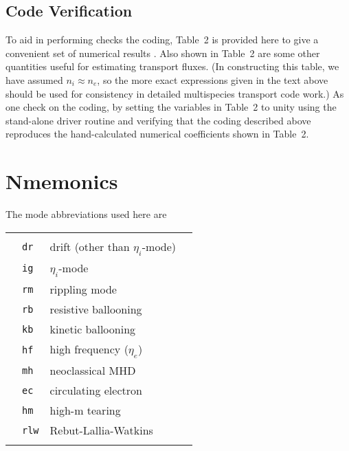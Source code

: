 
\subsection{Code Verification}

To aid in performing checks the coding, Table~2
is provided here to give a convenient set of numerical results
\cite{Comments}.
Also shown in Table~2 are some other quantities useful
for estimating transport fluxes.  (In constructing this table, we have
assumed $n_{i}\approx n_{e}$, so the more exact expressions given in the
text above
should be used for consistency in detailed multispecies transport code work.)
As one check on the coding, by setting the variables in Table~2 to
unity using the stand-alone driver routine and verifying that the coding
described above reproduces the hand-calculated numerical coefficients
shown in Table~2.

\section{Nmemonics}

The mode abbreviations used here are
\begin{center}
\begin{tabular}{llll}
    &             &                                         &        \\
    & {\tt dr}    & drift (other than $\eta_{i}$-mode)      &        \\
    & {\tt ig}    & $\eta_i$-mode                           &        \\
    & {\tt rm}    & rippling mode                           &        \\
    & {\tt rb}    & resistive ballooning                    &        \\
    & {\tt kb}    & kinetic ballooning                      &        \\
    & {\tt hf}    & high frequency ($\eta_{e}$)             &        \\
    & {\tt mh}    & neoclassical MHD                        &        \\
    & {\tt ec}    & circulating electron                    &        \\
    & {\tt hm}    & high-m tearing                          &        \\
    & {\tt rlw}   & Rebut-Lallia-Watkins                    &        \\
    &             &                                         &
\end{tabular}
\end{center}

